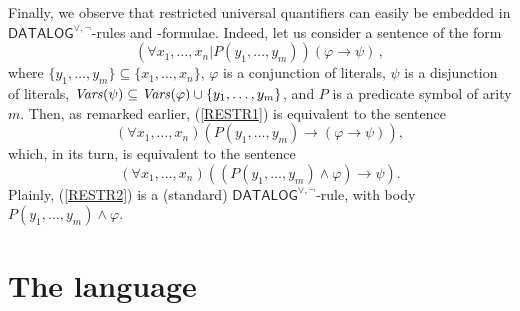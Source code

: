 \documentclass[a4paper]{llncs}
\newcommand{\DisjDatalog}{\ensuremath{\mathsf{DATALOG}^{\vee,\neg}}\xspace}
\newcommand{\nat}{\mathbb{N}}
\begin{document}
Finally, we observe that restricted universal quantifiers
can easily be embedded  in \DisjDatalog-rules and -formulae.
Indeed, let us consider a sentence of the form
\begin{equation}\label{RESTR1}
  (\forall x_1, \ldots, x_n | P(y_1, \ldots, y_m))(\varphi \rightarrow
  \psi)\,,
\end{equation}
where $\{y_1, \ldots, y_m\} \subseteq \{x_1, \ldots, x_n\}$, 
$\varphi$ is a conjunction of literals, $\psi$ is a disjunction
of literals, $\mathit{Vars}(\psi) \subseteq \mathit{Vars}(\varphi) \cup
\{y_{1},\ldots,y_{m}\}$, and $P$ is a predicate symbol of arity $m$.
Then, as remarked earlier, (\ref{RESTR1}) is equivalent to the sentence
\[
  (\forall x_1, \ldots, x_n)(P(y_1, \ldots, y_m) \rightarrow (\varphi
  \rightarrow \psi)),
\]
which, in its turn, is equivalent to the sentence
\begin{equation}\label{RESTR2}
  (\forall x_1, \ldots, x_n)((P(y_1, \ldots, y_m) \wedge \varphi)
  \rightarrow \psi).
\end{equation}
Plainly, (\ref{RESTR2}) is a (standard) $\DisjDatalog$-rule, with body
$P(y_1, \ldots, y_m) \wedge \varphi$.


\section{The language \Forallpizero}\label{FORALLPIZERO}
\end{document}
